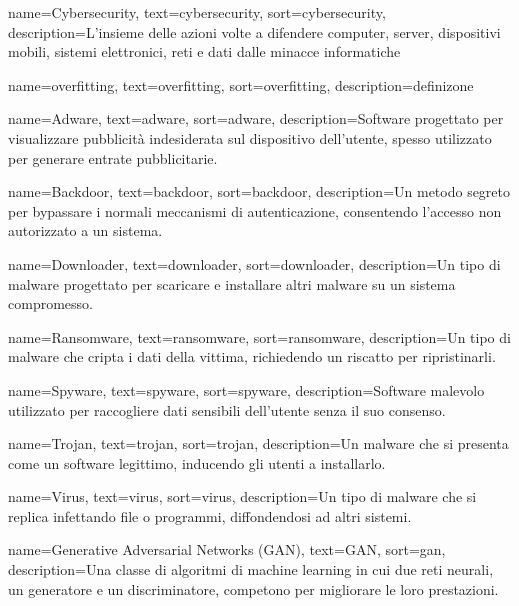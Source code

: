 
 {
    name={Cybersecurity},
    text={cybersecurity},
    sort={cybersecurity},
    description={L'insieme delle azioni volte a difendere computer, server, dispositivi mobili, sistemi elettronici, reti e dati dalle minacce informatiche}
}

 {
    name={overfitting},
    text={overfitting},
    sort={overfitting},
    description={definizone}
}

 {
    name={Adware},
    text={adware},
    sort={adware},
    description={Software progettato per visualizzare pubblicità indesiderata sul dispositivo dell'utente, spesso utilizzato per generare entrate pubblicitarie.}
}

 {
    name={Backdoor},
    text={backdoor},
    sort={backdoor},
    description={Un metodo segreto per bypassare i normali meccanismi di autenticazione, consentendo l'accesso non autorizzato a un sistema.}
}

 {
    name={Downloader},
    text={downloader},
    sort={downloader},
    description={Un tipo di malware progettato per scaricare e installare altri malware su un sistema compromesso.}
}

 {
    name={Ransomware},
    text={ransomware},
    sort={ransomware},
    description={Un tipo di malware che cripta i dati della vittima, richiedendo un riscatto per ripristinarli.}
}

 {
    name={Spyware},
    text={spyware},
    sort={spyware},
    description={Software malevolo utilizzato per raccogliere dati sensibili dell'utente senza il suo consenso.}
}

 {
    name={Trojan},
    text={trojan},
    sort={trojan},
    description={Un malware che si presenta come un software legittimo, inducendo gli utenti a installarlo.}
}

 {
    name={Virus},
    text={virus},
    sort={virus},
    description={Un tipo di malware che si replica infettando file o programmi, diffondendosi ad altri sistemi.}
}

 {
    name={Generative Adversarial Networks (GAN)},
    text={GAN},
    sort={gan},
    description={Una classe di algoritmi di machine learning in cui due reti neurali, un generatore e un discriminatore, competono per migliorare le loro prestazioni.}
}

